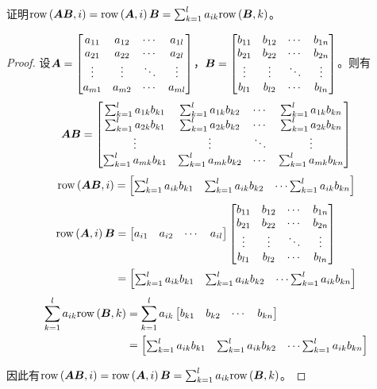 \begin{extraprob}\label{extra-1.1}
    证明\(\row{\mata\matb}{i}=\row{\mata}{i}\matb=\sum_{k=1}^la_{ik}\row{\matb}{k}\)。
\end{extraprob}
\begin{proof}
    设\(\mata=\normmat{bmatrix}{a}{m}{l}\)，\(\matb=\normmat{bmatrix}{b}{l}{n}\)。则有
    \begin{equation*}
        \mata\matb=
        \begin{bmatrix}
            \sum_{k=1}^la_{1k}b_{k1} & \sum_{k=1}^la_{1k}b_{k2} & \cdots & \sum_{k=1}^la_{1k}b_{kn} \\
            \sum_{k=1}^la_{2k}b_{k1} & \sum_{k=1}^la_{2k}b_{k2} & \cdots & \sum_{k=1}^la_{2k}b_{kn} \\
            \vdots                   & \vdots                   & \ddots & \vdots                   \\
            \sum_{k=1}^la_{mk}b_{k1} & \sum_{k=1}^la_{mk}b_{k2} & \cdots & \sum_{k=1}^la_{mk}b_{kn}
        \end{bmatrix}
    \end{equation*}
    \begin{equation*}
        \row{\mata\matb}{i}=
        \begin{bmatrix}
            \sum_{k=1}^la_{ik}b_{k1} & \sum_{k=1}^la_{ik}b_{k2} & \cdots\sum_{k=1}^la_{ik}b_{kn}
        \end{bmatrix}
    \end{equation*}
    \begin{align*}
        \row{\mata}{i}\matb & =
        \begin{bmatrix}
            a_{i1} & a_{i2} & \cdots & a_{il}
        \end{bmatrix}\normmat{bmatrix}{b}{l}{n} \\
                            & =
        \begin{bmatrix}
            \sum_{k=1}^la_{ik}b_{k1} & \sum_{k=1}^la_{ik}b_{k2} & \cdots\sum_{k=1}^la_{ik}b_{kn}
        \end{bmatrix}
    \end{align*}
    \begin{align*}
        \sum_{k=1}^la_{ik}\row{\matb}{k} & =\sum_{k=1}^la_{ik}
        \begin{bmatrix}
            b_{k1} & b_{k2} & \cdots & b_{kn}
        \end{bmatrix}                      \\
                                         & =
        \begin{bmatrix}
            \sum_{k=1}^la_{ik}b_{k1} & \sum_{k=1}^la_{ik}b_{k2} & \cdots\sum_{k=1}^la_{ik}b_{kn}
        \end{bmatrix}
    \end{align*}

    因此有\(\row{\mata\matb}{i}=\row{\mata}{i}\matb=\sum_{k=1}^la_{ik}\row{\matb}{k}\)。
\end{proof}

